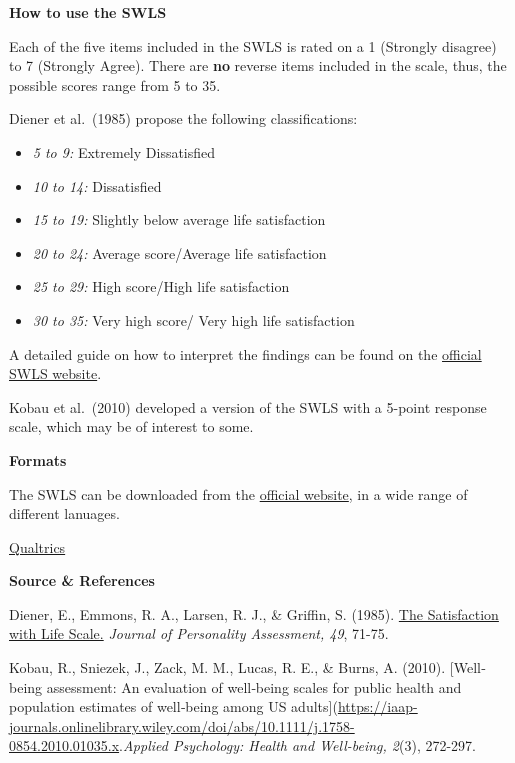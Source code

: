 \documentclass[
]{book}
\providecommand{\tightlist}{%
  \setlength{\itemsep}{0pt}\setlength{\parskip}{0pt}}
\begin{document}
\textbf{How to use the SWLS}

Each of the five items included in the SWLS is rated on a 1 (Strongly disagree) to 7 (Strongly Agree). There are \textbf{no} reverse items included in the scale, thus, the possible scores range from 5 to 35.

Diener et al.~(1985) propose the following classifications:

\begin{itemize}
\tightlist
\item
  \emph{5 to 9:} Extremely Dissatisfied
\item
  \emph{10 to 14:} Dissatisfied
\item
  \emph{15 to 19:} Slightly below average life satisfaction
\item
  \emph{20 to 24:} Average score/Average life satisfaction
\item
  \emph{25 to 29:} High score/High life satisfaction
\item
  \emph{30 to 35:} Very high score/ Very high life satisfaction
\end{itemize}

A detailed guide on how to interpret the findings can be found on the \href{http://labs.psychology.illinois.edu/~ediener/SWLS.html}{official SWLS website}.

Kobau et al.~(2010) developed a version of the SWLS with a 5-point response scale, which may be of interest to some.

\textbf{Formats}

The SWLS can be downloaded from the \href{http://labs.psychology.illinois.edu/~ediener/SWLS.html}{official website}, in a wide range of different lanuages.

\href{link\%20to\%20file}{Qualtrics}

\textbf{Source \& References}

Diener, E., Emmons, R. A., Larsen, R. J., \& Griffin, S. (1985). \href{https://emmons.faculty.ucdavis.edu/wp-content/uploads/sites/90/2015/08/1985_5-SWLS.pdf}{The Satisfaction with Life Scale.} \emph{Journal of Personality Assessment, 49}, 71-75.

Kobau, R., Sniezek, J., Zack, M. M., Lucas, R. E., \& Burns, A. (2010). {[}Well‐being assessment: An evaluation of well‐being scales for public health and population estimates of well‐being among US adults{]}(\url{https://iaap-journals.onlinelibrary.wiley.com/doi/abs/10.1111/j.1758-0854.2010.01035.x}.\emph{Applied Psychology: Health and Well-being, 2}(3), 272-297.
\end{document}
